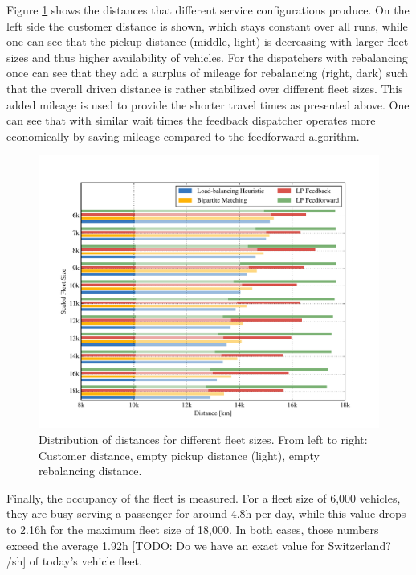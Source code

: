 
Figure \ref{fig:distances} shows the distances that different service configurations
produce. On the left side the customer distance is shown, which stays constant
over all runs, while one can see that the pickup distance (middle, light) is decreasing
with larger fleet sizes and thus higher availability of vehicles. For the dispatchers
with rebalancing once can see that they add a surplus of mileage for rebalancing (right, dark)
such that the overall driven distance is rather stabilized over different fleet sizes.
This added mileage is used to provide the shorter travel times as presented above.
One can see that with similar wait times the feedback dispatcher operates more economically
by saving mileage compared to the feedforward algorithm.

\begin{figure}
\includegraphics[width=1.0\textwidth]{figures/distances.pdf}
\caption{Distribution of distances for different fleet sizes. From left to right:
Customer distance, empty pickup distance (light), empty rebalancing distance.}
\label{fig:distances}
\end{figure}

Finally, the occupancy of the fleet is measured. For a fleet size of 6,000
vehicles, they are busy serving a passenger for around 4.8h per day, while
this value drops to 2.16h for the maximum fleet size of 18,000. In both cases,
those numbers exceed the average 1.92h [TODO: Do we have an exact value for Switzerland? /sh] of today's vehicle fleet.

